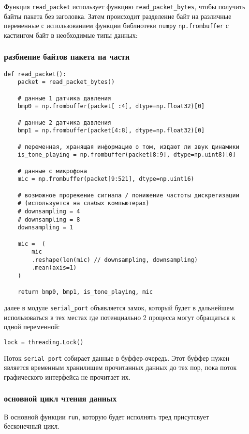 \documentclass[../main.tex]{subfiles}
\begin{document}
Функция \texttt{read\_packet} использует функцию \texttt{read\_packet\_bytes}, чтобы получить байты пакета без заголовка. Затем происходит разделение байт на различные переменные с использованием функции библиотеки \texttt{numpy} \texttt{np.frombuffer} с кастингом байт в необходимые типы данных:

\subsubsection{разбиение байтов пакета на части}

\begin{lstlisting}
def read_packet():
    packet = read_packet_bytes()
    
    # данные 1 датчика давления
    bmp0 = np.frombuffer(packet[ :4], dtype=np.float32)[0]
    
    # данные 2 датчика давления
    bmp1 = np.frombuffer(packet[4:8], dtype=np.float32)[0]
    
    # переменная, хранящая информацию о том, издают ли звук динамики
    is_tone_playing = np.frombuffer(packet[8:9], dtype=np.uint8)[0]
    
    # данные с микрофона
    mic = np.frombuffer(packet[9:521], dtype=np.uint16)

    # возможное прорежение сигнала / понижение частоты дискретизации
    # (используется на слабых компьютерах)
    # downsampling = 4
    # downsampling = 8
    downsampling = 1

    mic =  (
        mic
        .reshape(len(mic) // downsampling, downsampling)
        .mean(axis=1)
    )

    return bmp0, bmp1, is_tone_playing, mic
\end{lstlisting}

далее в модуле \texttt{serial\_port} объявляется замок, который будет в дальнейшем использоваться в тех местах где потенциально 2 процесса могут обращаться к одной переменной:

\begin{lstlisting}
lock = threading.Lock()
\end{lstlisting}

Поток \texttt{serial\_port} собирает данные в буффер-очередь. Этот буффер нужен является временным хранилищем прочитанных данных до тех пор, пока поток графического интерфейса не прочитает их.

\subsubsection{основной цикл чтения данных}
В основной функции \texttt{run}, которую будет исполнять тред присутсвует бесконечный цикл. 
\end{document}
